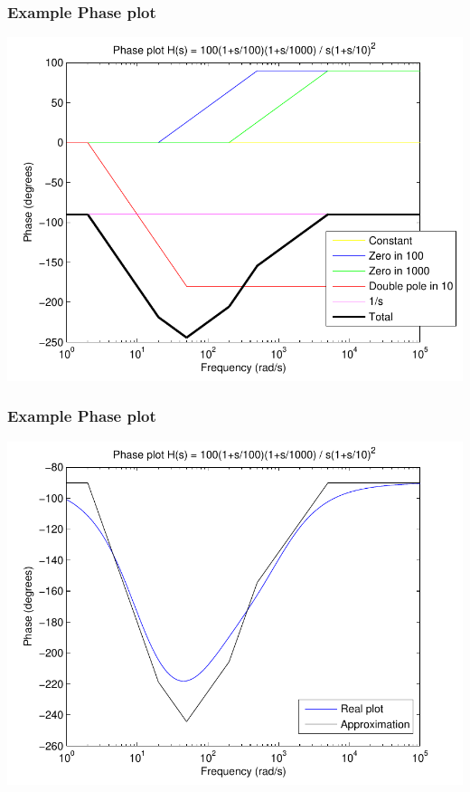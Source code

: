 \begin{frame}
\frametitle{Example Phase plot}

\begin{center}
\includegraphics[scale=0.5]{PhaseParts}
\end{center}


\end{frame}

\begin{frame}
\frametitle{Example Phase plot}

\begin{center}
\includegraphics[scale=0.5]{PhaseApprox}
\end{center}


\end{frame}

